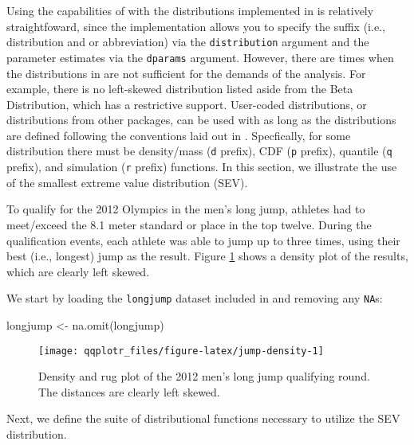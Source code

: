 Using the capabilities of  with the distributions
implemented in  is relatively straightfoward, since the
implementation allows you to specify the suffix (i.e., distribution and
or abbreviation) via the \texttt{distribution} argument and the
parameter estimates via the \texttt{dparams} argument. However, there
are times when the distributions in  are not sufficient for
the demands of the analysis. For example, there is no left-skewed
distribution listed aside from the Beta Distribution, which has a
restrictive support. User-coded distributions, or distributions from
other packages, can be used with  as long as the
distributions are defined following the conventions laid out in
. Specfically, for some distribution there must be
density/mass (\texttt{d} prefix), CDF (\texttt{p} prefix), quantile
(\texttt{q} prefix), and simulation (\texttt{r} prefix) functions. In
this section, we illustrate the use of the smallest extreme value
distribution (SEV).

To qualify for the 2012 Olympics in the men's long jump, athletes had to
meet/exceed the 8.1 meter standard or place in the top twelve. During
the qualification events, each athlete was able to jump up to three
times, using their best (i.e., longest) jump as the result. Figure
\ref{fig:jump-density} shows a density plot of the results, which are
clearly left skewed.

We start by loading the \texttt{longjump} dataset included in
 and removing any \texttt{NA}s:

\begin{Schunk}
\begin{Sinput}
longjump <- na.omit(longjump)
\end{Sinput}
\end{Schunk}

\begin{Schunk}
\begin{figure}

{\centering \texttt{[image: qqplotr\_files/figure-latex/jump-density-1]} 

}

\caption[Density and rug plot of the 2012 men's long jump qualifying round]{Density and rug plot of the 2012 men's long jump qualifying round. The distances are clearly left skewed.}\label{fig:jump-density}
\end{figure}
\end{Schunk}

Next, we define the suite of distributional functions necessary to
utilize the SEV distribution.

